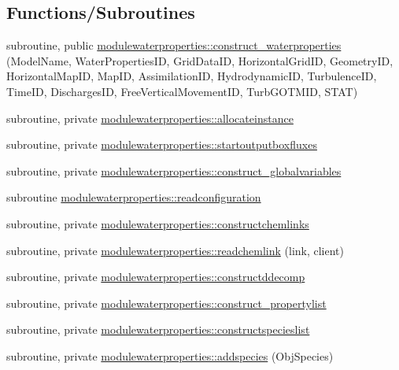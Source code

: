 \subsection*{Functions/\+Subroutines}
\begin{DoxyCompactItemize}
\item 
subroutine, public \mbox{\hyperlink{namespacemodulewaterproperties_a4b5a43f1052c697cd24d266317cd9be5}{modulewaterproperties\+::construct\+\_\+waterproperties}} (Model\+Name, Water\+Properties\+ID, Grid\+Data\+ID, Horizontal\+Grid\+ID, Geometry\+ID, Horizontal\+Map\+ID, Map\+ID, Assimilation\+ID, Hydrodynamic\+ID, Turbulence\+ID, Time\+ID, Discharges\+ID, Free\+Vertical\+Movement\+ID, Turb\+G\+O\+T\+M\+ID, S\+T\+AT)
\item 
subroutine, private \mbox{\hyperlink{namespacemodulewaterproperties_ade36efb7389c89e5e20b885a9157f285}{modulewaterproperties\+::allocateinstance}}
\item 
subroutine, private \mbox{\hyperlink{namespacemodulewaterproperties_ab589508866130f683e9d48bc7aeb235c}{modulewaterproperties\+::startoutputboxfluxes}}
\item 
subroutine, private \mbox{\hyperlink{namespacemodulewaterproperties_a23995dd394222f8d9f2a52604e119d73}{modulewaterproperties\+::construct\+\_\+globalvariables}}
\item 
subroutine \mbox{\hyperlink{namespacemodulewaterproperties_abba5d253e1014bd117f71c0ea3a37d58}{modulewaterproperties\+::readconfiguration}}
\item 
subroutine, private \mbox{\hyperlink{namespacemodulewaterproperties_aac68ff898a933da27b109068c70a5f15}{modulewaterproperties\+::constructchemlinks}}
\item 
subroutine, private \mbox{\hyperlink{namespacemodulewaterproperties_a9745c5b394a2c3fc11587bda05c362d6}{modulewaterproperties\+::readchemlink}} (link, client)
\item 
subroutine, private \mbox{\hyperlink{namespacemodulewaterproperties_aea1140bf6cb4f7e78048a1a4a434435d}{modulewaterproperties\+::constructddecomp}}
\item 
subroutine, private \mbox{\hyperlink{namespacemodulewaterproperties_a4eb6420a0cc772838269f9aed6c4394e}{modulewaterproperties\+::construct\+\_\+propertylist}}
\item 
subroutine, private \mbox{\hyperlink{namespacemodulewaterproperties_aab78d8efe1058e8c8918e9ae266897d0}{modulewaterproperties\+::constructspecieslist}}
\item 
subroutine, private \mbox{\hyperlink{namespacemodulewaterproperties_a3a5d5bfc3fea263034ab4c86a339e9f5}{modulewaterproperties\+::addspecies}} (Obj\+Species)

\end{DoxyCompactItemize}
